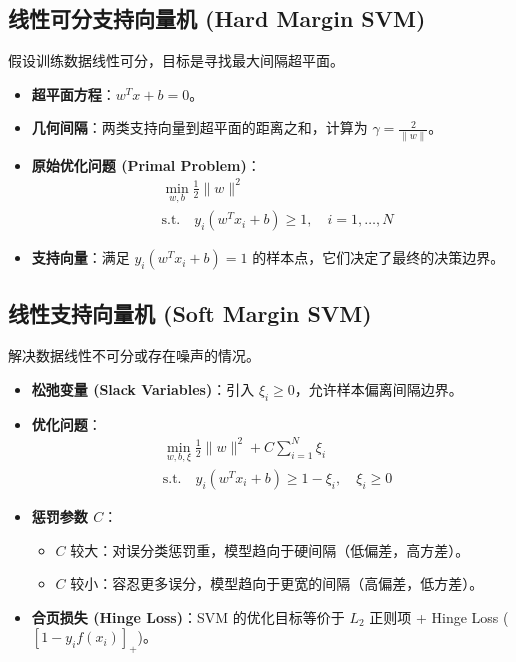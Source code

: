 \documentclass[a4paper, 11pt]{ctexart}
\begin{document}
\subsection{线性可分支持向量机 (Hard Margin SVM)}
假设训练数据线性可分，目标是寻找最大间隔超平面。
\begin{itemize}
    \item \textbf{超平面方程}：$w^T x + b = 0$。
    \item \textbf{几何间隔}：两类支持向量到超平面的距离之和，计算为 $\gamma = \frac{2}{\|w\|}$。
    \item \textbf{原始优化问题 (Primal Problem)}：
    \begin{equation}
        \begin{aligned}
        & \min_{w,b} \frac{1}{2} \|w\|^2 \\
        & \text{s.t.} \quad y_i(w^T x_i + b) \ge 1, \quad i=1,\dots,N
        \end{aligned}
    \end{equation}
    \item \textbf{支持向量}：满足 $y_i(w^T x_i + b) = 1$ 的样本点，它们决定了最终的决策边界。
\end{itemize}

\subsection{线性支持向量机 (Soft Margin SVM)}
解决数据线性不可分或存在噪声的情况。
\begin{itemize}
    \item \textbf{松弛变量 (Slack Variables)}：引入 $\xi_i \ge 0$，允许样本偏离间隔边界。
    \item \textbf{优化问题}：
    \begin{equation}
        \begin{aligned}
        & \min_{w,b,\xi} \frac{1}{2} \|w\|^2 + C \sum_{i=1}^N \xi_i \\
        & \text{s.t.} \quad y_i(w^T x_i + b) \ge 1 - \xi_i, \quad \xi_i \ge 0
        \end{aligned}
    \end{equation}
    \item \textbf{惩罚参数 $C$}：
    \begin{itemize}
        \item $C$ 较大：对误分类惩罚重，模型趋向于硬间隔（低偏差，高方差）。
        \item $C$ 较小：容忍更多误分，模型趋向于更宽的间隔（高偏差，低方差）。
    \end{itemize}
    \item \textbf{合页损失 (Hinge Loss)}：SVM 的优化目标等价于 $L_2$ 正则项 + Hinge Loss ($[1 - y_i f(x_i)]_+$)。
\end{itemize}
\end{document}
